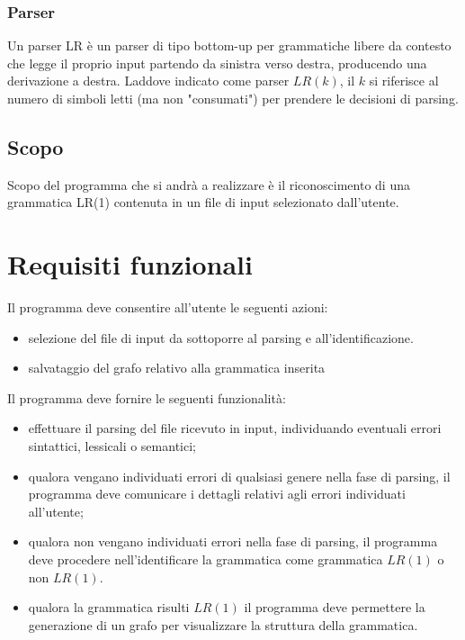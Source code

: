 \documentclass[12pt]{article}
\begin{document}
\subsubsection*{Parser}
Un parser LR è un parser di tipo bottom-up per grammatiche libere da contesto che legge il proprio input partendo da sinistra verso destra, producendo una derivazione a destra. Laddove indicato come parser $LR \left( k \right)$, il $k$ si riferisce al numero di simboli letti (ma non "consumati") per prendere le decisioni di parsing.

\subsection{Scopo}
Scopo del programma che si andrà a realizzare è il riconoscimento di una grammatica LR(1) contenuta in un file di input selezionato dall'utente. \par

\pagebreak

\section{Requisiti funzionali}

Il programma deve consentire all'utente le seguenti azioni:
\begin{itemize}
\item selezione del file di input da sottoporre al parsing e all'identificazione.
\item salvataggio del grafo relativo alla grammatica inserita
\end{itemize}
Il programma deve fornire le seguenti funzionalità:
\begin{itemize}
\item effettuare il parsing del file ricevuto in input, individuando eventuali errori sintattici, lessicali o semantici;
\item qualora vengano individuati errori di qualsiasi genere nella fase di parsing, il programma deve comunicare i dettagli relativi agli errori individuati all'utente;
\item qualora non vengano individuati errori nella fase di parsing, il programma deve procedere nell'identificare la grammatica come grammatica $LR \left( 1 \right)$ o non $LR \left( 1 \right)$.
\item qualora la grammatica risulti $LR \left( 1 \right)$ il programma deve permettere la generazione di un grafo per visualizzare la struttura della grammatica.
\end{itemize}  
\end{document}
